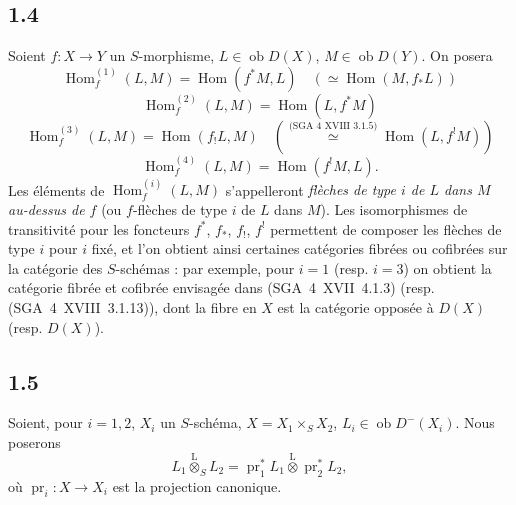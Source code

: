 \documentclass[11pt]{article}
\DeclareMathOperator{\Hom}{Hom}
\newcommand{\ob}{\operatorname{ob}}
\providecommand{\pr}{\operatorname{pr}}
\providecommand{\Hom}{\operatorname{Hom}}
\providecommand{\ob}{\operatorname{ob}}
\providecommand{\pr}{\operatorname{pr}}
\providecommand{\Hom}{\operatorname{Hom}}
\begin{document}
\subsection*{1.4}
Soient $f:X\to Y$ un $S$-morphisme, $L\in\ob D(X)$, $M\in\ob D(Y)$. On posera
\[
\Hom_f^{(1)}(L,M)=\Hom(f^{*}M,L)\quad (\simeq \Hom(M,f_{*}L))
\]
\[
\Hom_f^{(2)}(L,M)=\Hom(L,f^{*}M)
\]
\[
\Hom_f^{(3)}(L,M)=\Hom(f_{!}L,M)\quad (\overset{\text{(SGA~4~XVIII~3.1.5)}}{\simeq} \Hom(L,f^{!}M))
\]
\[
\Hom_f^{(4)}(L,M)=\Hom(f^{!}M,L).
\]
Les éléments de $\Hom_f^{(i)}(L,M)$ s'appelleront \emph{flèches de type $i$ de $L$ dans $M$ au-dessus de $f$} (ou $f$-flèches de type $i$ de $L$ dans $M$). Les isomorphismes de transitivité pour les foncteurs $f^{*}$, $f_{*}$, $f_{!}$, $f^{!}$ permettent de composer les flèches de type $i$ pour $i$ fixé, et l'on obtient ainsi certaines catégories fibrées ou cofibrées sur la catégorie des $S$-schémas : par exemple, pour $i=1$ (resp. $i=3$) on obtient la catégorie fibrée et cofibrée envisagée dans (SGA~4~XVII~4.1.3) (resp. (SGA~4~XVIII~3.1.13)), dont la fibre en $X$ est la catégorie opposée à $D(X)$ (resp. $D(X)$).

\subsection*{1.5}
Soient, pour $i=1,2$, $X_i$ un $S$-schéma, $X=X_1\times_S X_2$, $L_i\in\ob D^{-}(X_i)$. Nous poserons
\[
L_1\overset{\mathrm{L}}{\otimes}_{S}L_2=\pr_1^{*}L_1\overset{\mathrm{L}}{\otimes}\pr_2^{*}L_2,
\]
où $\pr_i:X\to X_i$ est la projection canonique.
\end{document}
